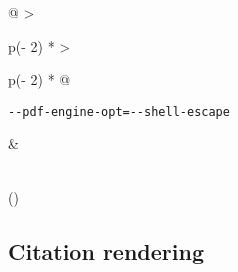 \begin{longtable}[]{@{}
  >{\raggedright\arraybackslash}p{(\columnwidth - 2\tabcolsep) * }
  >{\raggedright\arraybackslash}p{(\columnwidth - 2\tabcolsep) * }@{}}
\begin{minipage}[t]{\linewidth}
\begin{verbatim}
--pdf-engine-opt=--shell-escape
\end{verbatim}
\end{minipage} & \begin{minipage}[t]{\linewidth}\raggedright
\begin{Shaded}
\begin{Highlighting}[]
\KeywordTok{:}
\AttributeTok{  }\KeywordTok{{-}}\AttributeTok{ }
\end{Highlighting}
\end{Shaded}

\begin{Shaded}
\begin{Highlighting}[]
\KeywordTok{:}\AttributeTok{ }
\end{Highlighting}
\end{Shaded}
\end{minipage} \\
\bottomrule()
\end{longtable}

\hypertarget{citation-rendering-1}{%
\subsection{Citation rendering}\label{citation-rendering-1}}

